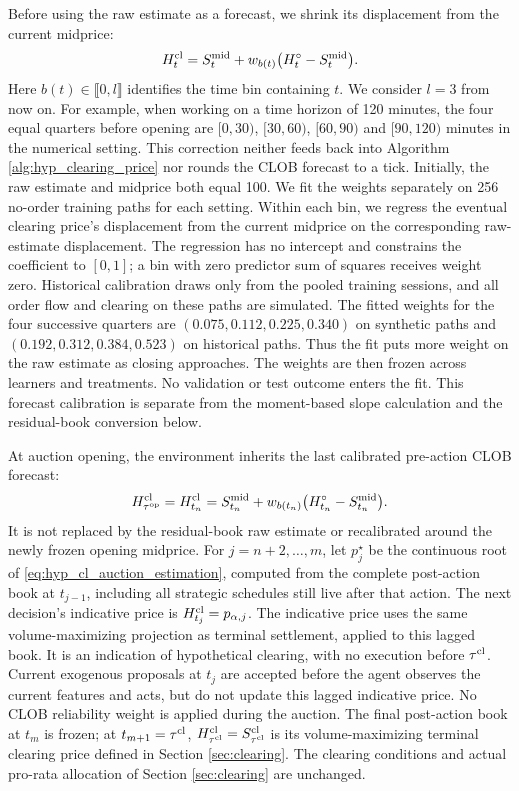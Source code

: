 \documentclass[11pt]{article}
\begin{document}
\begingroup
Before using the raw estimate as a forecast, we shrink its displacement from the current midprice:
\[
H_t^{\mathrm{cl}}=S_t^{\mathrm{mid}}+w_{b(t)}\bigl(H_t^\circ-S_t^{\mathrm{mid}}\bigr).
\]
Here $b(t)\in\llbracket 0,l \rrbracket$ identifies the time bin containing $t$. We consider $l=3$ from now on. For example, when working on a time horizon of 120 minutes, the four equal quarters before opening are $[0,30)$, $[30,60)$, $[60,90)$ and $[90,120)$ minutes in the numerical setting. This correction neither feeds back into Algorithm \ref{alg:hyp_clearing_price} nor rounds the CLOB forecast to a tick. Initially, the raw estimate and midprice both equal 100. We fit the weights separately on 256 no-order training paths for each setting. Within each bin, we regress the eventual {clearing price}'s displacement from the current midprice on the corresponding raw-estimate displacement. The regression has no intercept and constrains the coefficient to $[0,1]$; a bin with zero predictor sum of squares receives weight zero. Historical calibration draws only from the pooled training sessions, and all order flow and clearing on these paths are simulated. The fitted weights for the four successive quarters are $(0.075,0.112,0.225,0.340)$ on synthetic paths and $(0.192,0.312,0.384,0.523)$ on historical paths. Thus the fit puts more weight on the raw estimate as closing approaches. The weights are then frozen across learners and treatments. No validation or test outcome enters the fit. This forecast calibration is separate from the moment-based slope calculation and the residual-book conversion below.\vspace{0.5em}

At auction opening, the environment inherits the last calibrated pre-action CLOB forecast:
\[
H_{\tau^{\mathrm{op}}}^{\mathrm{cl}}=H_{t_n}^{\mathrm{cl}}
=S_{t_n}^{\mathrm{mid}}+w_{b(t_n)}\bigl(H_{t_n}^\circ-S_{t_n}^{\mathrm{mid}}\bigr).
\]
It is not replaced by the residual-book raw estimate or recalibrated around the newly frozen opening midprice. For $j=n+2,\ldots,m$, let $p_j^\star$ be the continuous root of \eqref{eq:hyp_cl_auction_estimation}, computed from the complete post-action book at $t_{j-1}$, including all strategic schedules still live after that action. The next decision's indicative price is $H_{t_j}^{\mathrm{cl}}=p_{\alpha,j}$. The indicative price uses the same volume-maximizing projection as terminal settlement, applied to this lagged book. It is an indication of hypothetical clearing, with no execution before $\tau^{\mathrm{cl}}$. Current exogenous proposals at $t_j$ are accepted before the agent observes the current features and acts, but do not update this lagged indicative price. No CLOB reliability weight is applied during the auction. The final post-action book at $t_m$ is frozen; at $t_{m+1}=\tau^{\mathrm{cl}}$, $H_{\tau^{\mathrm{cl}}}^{\mathrm{cl}}=S_{\tau^{\mathrm{cl}}}^{\mathrm{cl}}$ is its volume-maximizing terminal clearing price defined in Section \ref{sec:clearing}. The clearing conditions and actual pro-rata allocation of Section \ref{sec:clearing} are unchanged.
\end{document}
